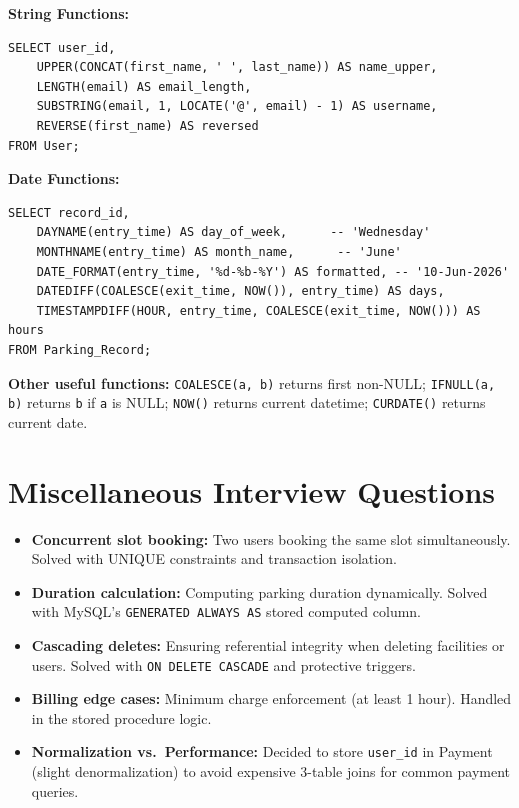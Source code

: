 \documentclass[12pt,a4paper]{article}
\begin{document}
\begin{questionbox}
\end{questionbox}
\begin{answerbox}
\textbf{String Functions:}
\begin{lstlisting}
SELECT user_id,
    UPPER(CONCAT(first_name, ' ', last_name)) AS name_upper,
    LENGTH(email) AS email_length,
    SUBSTRING(email, 1, LOCATE('@', email) - 1) AS username,
    REVERSE(first_name) AS reversed
FROM User;
\end{lstlisting}

\textbf{Date Functions:}
\begin{lstlisting}
SELECT record_id,
    DAYNAME(entry_time) AS day_of_week,      -- 'Wednesday'
    MONTHNAME(entry_time) AS month_name,      -- 'June'
    DATE_FORMAT(entry_time, '%d-%b-%Y') AS formatted, -- '10-Jun-2026'
    DATEDIFF(COALESCE(exit_time, NOW()), entry_time) AS days,
    TIMESTAMPDIFF(HOUR, entry_time, COALESCE(exit_time, NOW())) AS hours
FROM Parking_Record;
\end{lstlisting}

\textbf{Other useful functions:} \texttt{COALESCE(a, b)} returns first non-NULL; \texttt{IFNULL(a, b)} returns \texttt{b} if \texttt{a} is NULL; \texttt{NOW()} returns current datetime; \texttt{CURDATE()} returns current date.
\end{answerbox}

\section{Miscellaneous Interview Questions}

\begin{questionbox}
\end{questionbox}
\begin{answerbox}
\begin{itemize}[nosep]
    \item \textbf{Concurrent slot booking:} Two users booking the same slot simultaneously. Solved with UNIQUE constraints and transaction isolation.
    \item \textbf{Duration calculation:} Computing parking duration dynamically. Solved with MySQL's \texttt{GENERATED ALWAYS AS} stored computed column.
    \item \textbf{Cascading deletes:} Ensuring referential integrity when deleting facilities or users. Solved with \texttt{ON DELETE CASCADE} and protective triggers.
    \item \textbf{Billing edge cases:} Minimum charge enforcement (at least 1 hour). Handled in the stored procedure logic.
    \item \textbf{Normalization vs.\ Performance:} Decided to store \texttt{user\_id} in Payment (slight denormalization) to avoid expensive 3-table joins for common payment queries.
\end{itemize}
\end{answerbox}
\end{document}
